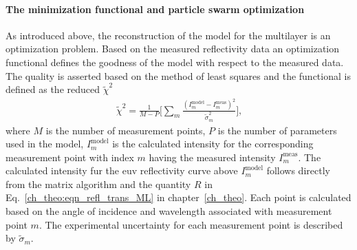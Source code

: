 \paragraph{The minimization functional and particle swarm optimization}
As introduced above, the reconstruction of the model for the multilayer is an optimization problem. Based on the measured reflectivity data an optimization functional defines the goodness of the model with respect to the measured data. The quality is asserted based on the method of least squares \cite{legendre_nouvelles_1805, gauss_theoria_1809, birge_calculation_1932} and the functional is defined as the reduced $\tilde{\chi}^2$
\begin{align}
\tilde{\chi}^2 = \frac{1}{M-P} \bigg[\sum\limits_{m} \frac{(I_m^\text{model} 
- I_m^\text{meas})^2}{\tilde{\sigma}_m^2} \bigg] \text{,} 
\label{ch_spec:eqn_reduced_chi_squared}
\end{align}
where $M$ is the number of measurement points, $P$ is the number of parameters used in the model, $I_m^\text{model}$ is the calculated intensity for the corresponding measurement point with index $m$ having the measured intensity $I_m^\text{meas}$. The calculated intensity fur the \gls{euv} reflectivity curve above $I_m^\text{model}$ follows directly from the matrix algorithm and the quantity $R$ in Eq.~\eqref{ch_theo:eqn_refl_trans_ML} in chapter~\ref{ch_theo}. Each point is calculated based on the angle of incidence and wavelength associated with measurement point $m$. The experimental uncertainty for each measurement point is described by $\tilde{\sigma}_m$.

